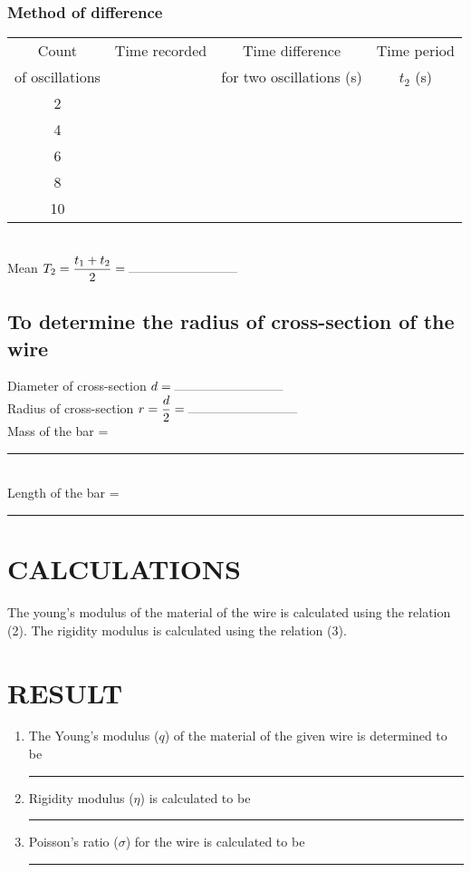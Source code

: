 \documentclass[12pt,a4paper]{article}
\begin{document}
			\subsubsection{Method of difference}
			\begin{center}
				\begin{tabular}{|c|c|c|c|}
					\hline
					\rowcolor{b1!50}Count&	Time recorded&	Time difference&	Time period \\
					\rowcolor{b1!50}of oscillations& &for two oscillations (s) &$t_{2}$ (s) \\ \hline
					2& && \\ \hline
					4& && \\ \hline
					6& && \\ \hline
					8& && \\ \hline
					10& && \\ \hline					
				\end{tabular}\\
				\vspace{11pt}
				Mean $T_{2} = \dfrac{t_{1}+t_{2}}{2} = \rule{20ex}{0.2pt}$
			\end{center}
			
			
		\subsection{To determine the radius of cross-section of the wire}
		
			Diameter of cross-section $d = \rule{20ex}{0.2pt}$
			\vspace{11pt}\\
			Radius of cross-section $r=\dfrac{d}{2} = \rule{20ex}{0.2pt}$
			\vspace{11pt}\\
			Mass of the bar = \rule{20ex}{0.2pt}
			\vspace{5pt}\\
			Length of the bar = \rule{20ex}{0.2pt}

	\section{CALCULATIONS}
		
		The young's modulus of the material of the wire is calculated using the relation (2). The rigidity modulus is calculated using the relation (3).
		
	\section{RESULT}
		\begin{enumerate}
			\item The Young's modulus ($q$) of the material of the given wire is determined to be \rule{20ex}{0.2pt}
			\item Rigidity modulus ($\eta$) is calculated to be \rule{20ex}{0.2pt}
			\item Poisson's ratio ($\sigma$) for the wire is calculated to be \rule{20ex}{0.2pt}
		\end{enumerate}
		
	
\end{document}
